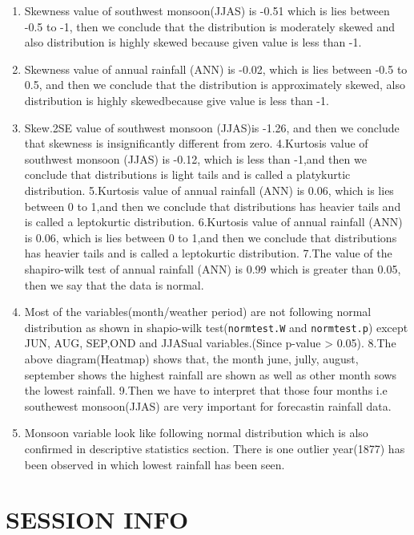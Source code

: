 \documentclass[12pt,openany]{book}
\providecommand{\tightlist}{%
  \setlength{\itemsep}{0pt}\setlength{\parskip}{0pt}}
\begin{document}
\begin{enumerate}
\def\labelenumi{\arabic{enumi}.}
\tightlist
\item
  Skewness value of southwest monsoon(JJAS) is -0.51 which is lies between -0.5 to -1, then we conclude that the distribution is moderately skewed and also distribution is highly skewed because given value is less than -1.
\item
  Skewness value of annual rainfall (ANN) is -0.02, which is lies between -0.5 to 0.5, and then we conclude that the distribution is approximately skewed, also distribution is highly skewedbecause give value is less than -1.
\item
  Skew.2SE value of southwest monsoon (JJAS)is -1.26, and then we conclude that skewness is insignificantly different from zero.
  4.Kurtosis value of southwest monsoon (JJAS) is -0.12, which is less than -1,and then we conclude that distributions is light tails and is called a platykurtic distribution.
  5.Kurtosis value of annual rainfall (ANN) is 0.06, which is lies between 0 to 1,and then we conclude that distributions has heavier tails and is called a leptokurtic distribution.
  6.Kurtosis value of annual rainfall (ANN) is 0.06, which is lies between 0 to 1,and then we conclude that distributions has heavier tails and is called a leptokurtic distribution.
  7.The value of the shapiro-wilk test of annual rainfall (ANN) is 0.99 which is greater than 0.05, then we say that the data is normal.
\item
  Most of the variables(month/weather period) are not following normal distribution as shown in shapio-wilk test(\texttt{normtest.W} and \texttt{normtest.p}) except JUN, AUG, SEP,OND and JJASual variables.(Since p-value \textgreater{} 0.05).
  8.The above diagram(Heatmap) shows that, the month june, jully, august, september shows the highest rainfall are shown as well as other month sows the lowest rainfall.
  9.Then we have to interpret that those four months i.e southewest monsoon(JJAS) are very important for forecastin rainfall data.
\item
  Monsoon variable look like following normal distribution which is also confirmed in descriptive statistics section. There is one outlier year(1877) has been observed in which lowest rainfall has been seen.
\end{enumerate}

\hypertarget{session-info}{%
\chapter{SESSION INFO}\label{session-info}}
\end{document}
